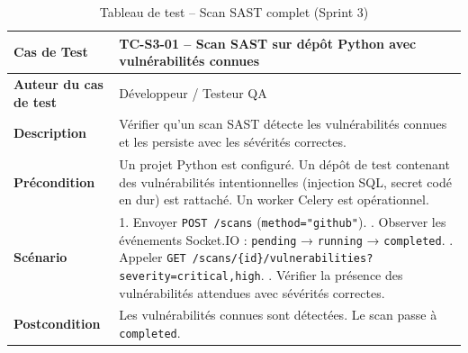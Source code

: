 \begin{table}[H]
\centering
\caption{Tableau de test -- Scan SAST complet (Sprint 3)}
\label{tab:test-sprint3-sast}
\small
\renewcommand{\arraystretch}{1.3}
\begin{tabularx}{\textwidth}{>{\bfseries}p{3.5cm} X}
\hline
Cas de Test & TC-S3-01 -- Scan SAST sur dépôt Python avec vulnérabilités connues \\
\hline
Auteur du cas de test & Développeur / Testeur QA \\
\hline
Description & Vérifier qu'un scan SAST détecte les vulnérabilités connues et les persiste avec les sévérités correctes. \\
\hline
Précondition & Un projet Python est configuré. Un dépôt de test contenant des vulnérabilités intentionnelles (injection SQL, secret codé en dur) est rattaché. Un worker Celery est opérationnel. \\
\hline
Scénario &
1. Envoyer \texttt{POST /scans} (\texttt{method="github"}). \newline
2. Observer les événements Socket.IO : \texttt{pending} → \texttt{running} → \texttt{completed}. \newline
3. Appeler \texttt{GET /scans/\{id\}/vulnerabilities?severity=critical,high}. \newline
4. Vérifier la présence des vulnérabilités attendues avec sévérités correctes. \\
\hline
Postcondition & Les vulnérabilités connues sont détectées. Le scan passe à \texttt{completed}. \\
\hline
\end{tabularx}
\end{table}

